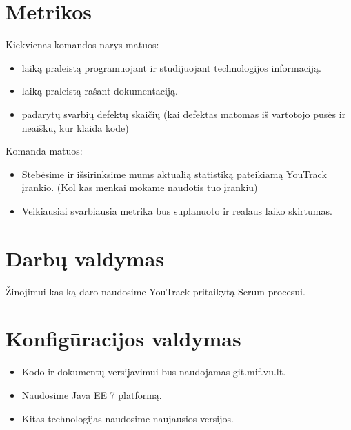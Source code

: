 \documentclass[11pt]{article}
\begin{document}
\section{Metrikos}
Kiekvienas komandos narys matuos:
\begin{itemize}
	\item laiką praleistą programuojant ir studijuojant technologijos informaciją.
	\item laiką praleistą rašant dokumentaciją.
	\item padarytų svarbių defektų skaičių (kai defektas matomas iš vartotojo pusės ir neaišku, kur klaida kode)
\end{itemize}
Komanda matuos:
\begin{itemize}
	\item Stebėsime ir išsirinksime mums aktualią statistiką pateikiamą YouTrack įrankio. (Kol kas menkai mokame naudotis tuo įrankiu)
	\item Veikiausiai svarbiausia metrika bus suplanuoto ir realaus laiko skirtumas.
\end{itemize}

\section{Darbų valdymas}
Žinojimui kas ką daro naudosime YouTrack pritaikytą Scrum procesui.

\section{Konfigūracijos valdymas}
\begin{itemize}
	\item Kodo ir dokumentų versijavimui bus naudojamas git.mif.vu.lt.
	\item Naudosime Java EE 7 platformą.
	\item Kitas technologijas naudosime naujausios versijos.
\end{itemize}
	
\end{document}
